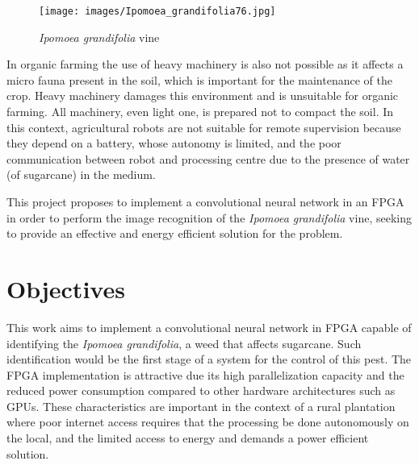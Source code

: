 \documentclass[
	12pt,				%
	oneside,			%
	a4paper,			%
	brazil,			    %
	french,				%
	spanish,			%
	english,			%
	]{abntex2}
\begin{document}
  \begin{figure}[htb]
	\caption{\label{fig:ipomoea}\textit{Ipomoea grandifolia} vine}
	\begin{center}
	    \texttt{[image: images/Ipomoea\_grandifolia76.jpg]}
	\end{center}
\end{figure}

  
  
  In organic farming the use of heavy machinery is also not possible as it affects a micro fauna present in the soil, which is important for the maintenance of the crop. Heavy machinery damages this environment and is unsuitable for organic farming. All machinery, even light one, is prepared not to compact the soil. In this context, agricultural robots are not suitable for remote supervision because they depend on a battery, whose autonomy is limited, and the poor communication between robot and processing centre due to the presence of water (of sugarcane) in the medium.
  
  This project proposes to implement a convolutional neural network in an FPGA in order to perform the image recognition of the \textit{Ipomoea grandifolia} vine, seeking to provide an effective and energy efficient solution for the problem.
  
    
\chapter[Objectives]{Objectives}
 
 This work aims to implement a convolutional neural network in FPGA capable of identifying the \textit{Ipomoea grandifolia}, a weed that affects sugarcane. Such identification would be the first stage of a system for the control of this pest. The FPGA implementation is attractive due its high parallelization capacity and the reduced power consumption compared to other hardware architectures such as GPUs. These characteristics are important in the context of a rural plantation where poor internet access requires that the processing be done  autonomously on the local, and the limited access to energy and demands a power efficient solution.
 
\end{document}
